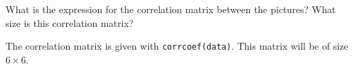 What is the expression for the correlation matrix between the pictures? What size is this correlation matrix?

\begin{solution}
    The correlation matrix is given with \texttt{corrcoef(data)}. This matrix will be of size $6 \times 6$.
\end{solution}